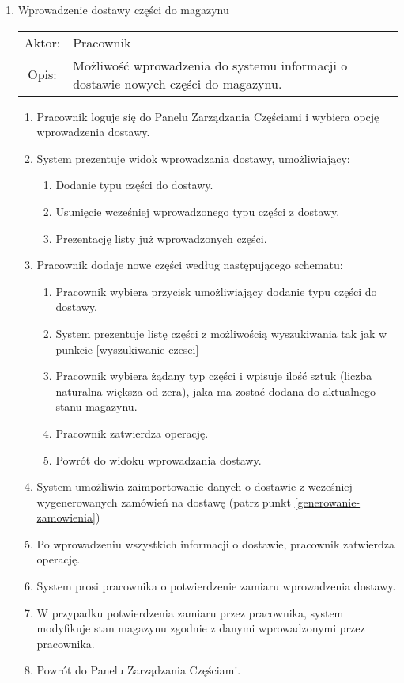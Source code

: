\begin{enumerate}
  \item Wprowadzenie dostawy części do magazynu \\
  \begin{tabularx}{\linewidth}{ c X }
  Aktor: & Pracownik \\
  Opis: & Możliwość wprowadzenia do systemu informacji o dostawie nowych części do magazynu.\\
  \end{tabularx}
   \begin{enumerate}
    \item Pracownik loguje się do Panelu Zarządzania Częściami i wybiera opcję wprowadzenia dostawy.
    \item System prezentuje widok wprowadzania dostawy, umożliwiający:
    \begin{enumerate}
      \item Dodanie typu części do dostawy.
      \item Usunięcie wcześniej wprowadzonego typu części z dostawy.
      \item Prezentację listy już wprowadzonych części.
    \end{enumerate}
    \item Pracownik dodaje nowe części według następującego schematu:
    \begin{enumerate}
      \item Pracownik wybiera przycisk umożliwiający dodanie typu części do dostawy.
      \item System prezentuje listę części z możliwością wyszukiwania tak jak w punkcie \ref{wyszukiwanie-czesci}
      \item Pracownik wybiera żądany typ części i wpisuje ilość sztuk (liczba naturalna większa od zera), jaka ma zostać dodana do aktualnego stanu magazynu.
      \item Pracownik zatwierdza operację.
      \item Powrót do widoku wprowadzania dostawy.
    \end{enumerate}
    \item System umożliwia zaimportowanie danych o dostawie z wcześniej wygenerowanych zamówień na dostawę (patrz punkt \ref{generowanie-zamowienia})
    \item Po wprowadzeniu wszystkich informacji o dostawie, pracownik zatwierdza operację.
    \item System prosi pracownika o potwierdzenie zamiaru wprowadzenia dostawy.
    \item W przypadku potwierdzenia zamiaru przez pracownika, system modyfikuje stan magazynu zgodnie z danymi wprowadzonymi przez pracownika.
    \item Powrót do Panelu Zarządzania Częściami.
  \end{enumerate}
  

\end{enumerate}
